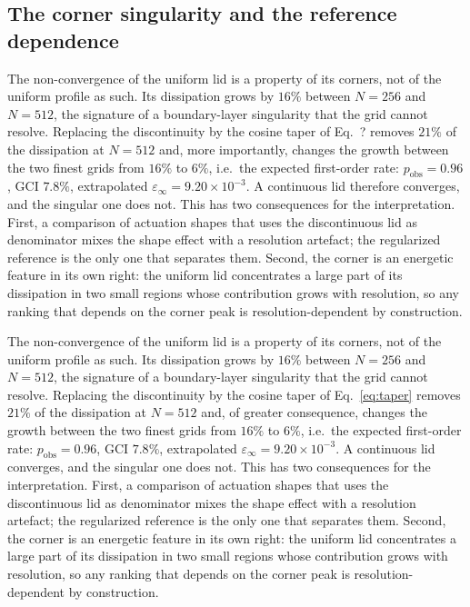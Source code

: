 \documentclass[11pt,a4paper]{article}
\newenvironment{chgadd}{\par\color{blue}}{\par\color{black}}
\newenvironment{chgdel}{\par\color{red}}{\par\color{black}}
\begin{document}
\subsection{The corner singularity and the reference dependence}
\label{sec:corner}

\begin{chgdel}
The non-convergence of the uniform lid is a property of its corners, not of the
uniform profile as such. Its dissipation grows by $16\%$ between $N=256$ and
$N=512$, the signature of a boundary-layer singularity that the grid cannot
resolve. Replacing the discontinuity by the cosine taper of Eq.~?
removes $21\%$ of the dissipation at $N=512$ and, more importantly, changes the
growth between the two finest grids from $16\%$ to $6\%$, i.e.\ the expected
first-order rate: $p_{\mathrm{obs}}=0.96$, GCI $7.8\%$, extrapolated
$\varepsilon_\infty=9.20\times10^{-3}$. A continuous lid therefore converges, and
the singular one does not. This has two consequences for the interpretation. First,
a comparison of actuation shapes that uses the discontinuous lid as denominator
mixes the shape effect with a resolution artefact; the regularized reference is
the only one that separates them. Second, the corner is an energetic feature in
its own right: the uniform lid concentrates a large part of its dissipation in two
small regions whose contribution grows with resolution, so any ranking that
depends on the corner peak is resolution-dependent by construction.
\end{chgdel}

\begin{chgadd}
The non-convergence of the uniform lid is a property of its corners, not of the
uniform profile as such. Its dissipation grows by $16\%$ between $N=256$ and
$N=512$, the signature of a boundary-layer singularity that the grid cannot
resolve. Replacing the discontinuity by the cosine taper of Eq.~\eqref{eq:taper}
removes $21\%$ of the dissipation at $N=512$ and, of greater consequence, changes the
growth between the two finest grids from $16\%$ to $6\%$, i.e.\ the expected
first-order rate: $p_{\mathrm{obs}}=0.96$, GCI $7.8\%$, extrapolated
$\varepsilon_\infty=9.20\times10^{-3}$. A continuous lid converges, and
the singular one does not. This has two consequences for the interpretation. First,
a comparison of actuation shapes that uses the discontinuous lid as denominator
mixes the shape effect with a resolution artefact; the regularized reference is
the only one that separates them. Second, the corner is an energetic feature in
its own right: the uniform lid concentrates a large part of its dissipation in two
small regions whose contribution grows with resolution, so any ranking that
depends on the corner peak is resolution-dependent by construction.
\end{chgadd}
\end{document}
